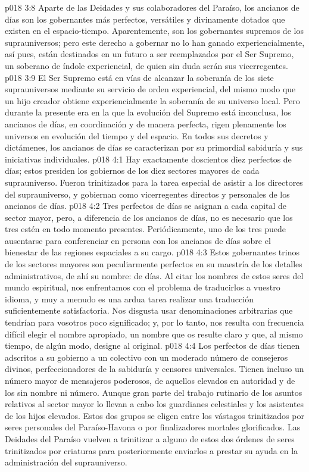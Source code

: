 \vs p018 3:8 \pc Aparte de las Deidades y sus colaboradores del Paraíso, los ancianos de días son los gobernantes más perfectos, versátiles y divinamente dotados que existen en el espacio\hyp{}tiempo. Aparentemente, son los gobernantes supremos de los suprauniversos; pero este derecho a gobernar no lo han ganado experiencialmente, así pues, están destinados en un futuro a ser reemplazados por el Ser Supremo, un soberano de índole experiencial, de quien sin duda serán sus vicerregentes.
\vs p018 3:9 El Ser Supremo está en vías de alcanzar la soberanía de los siete suprauniversos mediante su servicio de orden experiencial, del mismo modo que un hijo creador obtiene experiencialmente la soberanía de su universo local. Pero durante la presente era en la que la evolución del Supremo está inconclusa, los ancianos de días, en coordinación y de manera perfecta, rigen plenamente los universos en evolución del tiempo y del espacio. En todos sus decretos y dictámenes, los ancianos de días se caracterizan por su primordial sabiduría y sus iniciativas individuales.
\vs p018 4:1 Hay exactamente doscientos diez perfectos de días; estos presiden los gobiernos de los diez sectores mayores de cada suprauniverso. Fueron trinitizados para la tarea especial de asistir a los directores del suprauniverso, y gobiernan como vicerregentes directos y personales de los ancianos de días.
\vs p018 4:2 Tres perfectos de días se asignan a cada capital de sector mayor, pero, a diferencia de los ancianos de días, no es necesario que los tres estén en todo momento presentes. Periódicamente, uno de los tres puede ausentarse para conferenciar en persona con los ancianos de días sobre el bienestar de las regiones espaciales a su cargo.
\vs p018 4:3 \pc Estos gobernantes trinos de los sectores mayores son peculiarmente perfectos en su maestría de los detalles administrativos, de ahí su nombre:  de días. Al citar los nombres de estos seres del mundo espiritual, nos enfrentamos con el problema de traducirlos a vuestro idioma, y muy a menudo es una ardua tarea realizar una traducción suficientemente satisfactoria. Nos disgusta usar denominaciones arbitrarias que tendrían para vosotros poco significado; y, por lo tanto, nos resulta con frecuencia difícil elegir el nombre apropiado, un nombre que os resulte claro y que, al mismo tiempo, de algún modo, designe al original.
\vs p018 4:4 \pc Los perfectos de días tienen adscritos a su gobierno a un colectivo con un moderado número de consejeros divinos, perfeccionadores de la sabiduría y censores universales. Tienen incluso un número mayor de mensajeros poderosos, de aquellos elevados en autoridad y de los sin nombre ni número. Aunque gran parte del trabajo rutinario de los asuntos relativos al sector mayor lo llevan a cabo los guardianes celestiales y los asistentes de los hijos elevados. Estos dos grupos se eligen entre los vástagos trinitizados por seres personales del Paraíso\hyp{}Havona o por finalizadores mortales glorificados. Las Deidades del Paraíso vuelven a trinitizar a alguno de estos dos órdenes de seres trinitizados por criaturas para posteriormente enviarlos a prestar su ayuda en la administración del suprauniverso.
